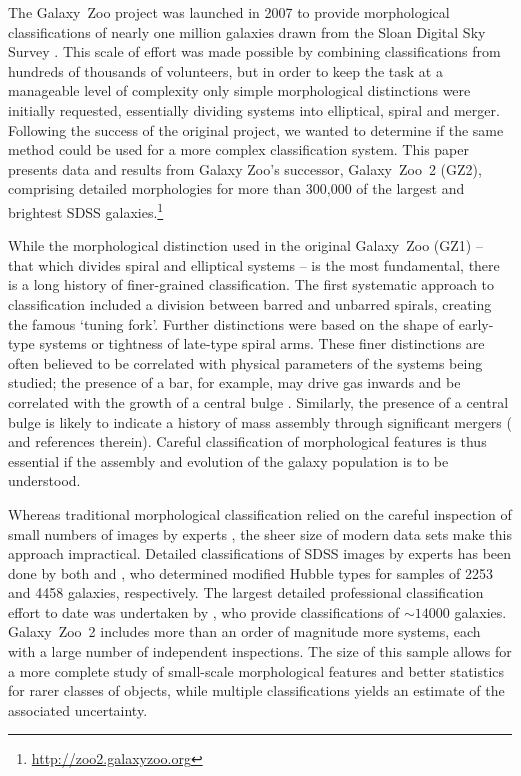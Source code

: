 \documentclass[useAMS,usenatbib]{mn2e}
\begin{document}
The Galaxy~Zoo project \citep{lin08} was launched in 2007 to provide morphological classifications of nearly one million galaxies drawn from the Sloan Digital Sky Survey \citep[SDSS;][]{yor00}. This scale of effort was made possible by combining classifications from hundreds of thousands of volunteers, but in order to keep the task at a manageable level of complexity only simple morphological distinctions were initially requested, essentially dividing systems into elliptical, spiral and merger. Following the success of the original project, we wanted to determine if the same method could be used for a more complex classification system. This paper presents data and results from Galaxy Zoo's successor, Galaxy~Zoo~2 (GZ2), comprising detailed morphologies for more than 300,000 of the largest and brightest SDSS galaxies.\footnote{\url{http://zoo2.galaxyzoo.org}}

While the morphological distinction used in the original Galaxy~Zoo (GZ1) -- that which divides spiral and elliptical systems -- is the most fundamental, there is a long history of finer-grained classification. The first systematic approach to classification \citep{hub36} included a division between barred and unbarred spirals, creating the famous `tuning fork'. Further distinctions were based on the shape of early-type systems or tightness of late-type spiral arms. These finer distinctions are often believed to be correlated with physical parameters of the systems being studied; the presence of a bar, for example, may drive gas inwards and be correlated with the growth of a central bulge \citep[a review is given in \citealt{kor04} and an updated picture by][]{mas11c}. Similarly, the presence of a central bulge is likely to indicate a history of mass assembly through significant mergers (\citealt{mar12} and references therein). Careful classification of morphological features is thus essential if the assembly and evolution of the galaxy population is to be understood.

Whereas traditional morphological classification relied on the careful inspection of small numbers of images by experts \citep[e.g., ][]{san61,dev91}, the sheer size of modern data sets make this approach impractical. Detailed classifications of SDSS images by experts has been done by both \citet{fuk07} and \citet{bai11}, who determined modified Hubble types for samples of 2253 and 4458 galaxies, respectively. The largest detailed professional classification effort to date was undertaken by \citet{nai10}, who provide classifications of $\sim14000$ galaxies. Galaxy~Zoo~2 includes more than an order of magnitude more systems, each with a large number of independent inspections. The size of this sample allows for a more complete study of small-scale morphological features and better statistics for rarer classes of objects, while multiple classifications yields an estimate of the associated uncertainty. 
\end{document}
